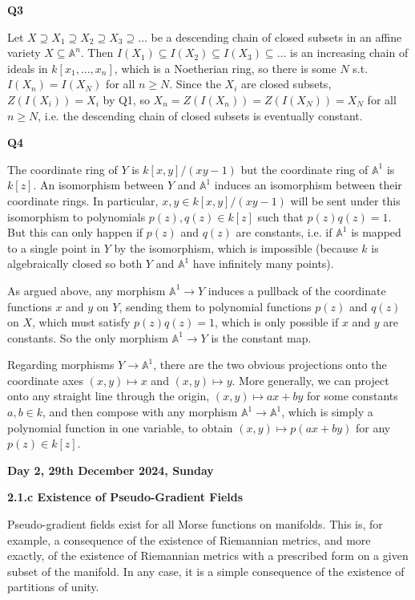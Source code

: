\documentclass[hidelinks, 12pt]{article}
\theoremstyle{mydefstyle}
\theoremstyle{mythmstyle}
\begin{document}
\textbf{Q3}

Let $X \supseteq X_1 \supseteq X_2 \supseteq X_3 \supseteq \dots$ be a descending chain of closed subsets in an affine variety $X \subseteq \mathbb{A}^n$. Then $I(X_1) \subseteq I(X_2) \subseteq I(X_3) \subseteq \dots$ is an increasing chain of ideals in $k[x_1, \dots, x_n]$, which is a Noetherian ring, so there is some $N$ s.t. $I(X_n) = I(X_N)$ for all $n \ge N$. Since the $X_i$ are closed subsets, $Z(I(X_i)) = X_i$ by Q1, so $X_n = Z(I(X_n)) = Z(I(X_N)) = X_N$ for all $n \ge N$, i.e. the descending chain of closed subsets is eventually constant.

\textbf{Q4}

The coordinate ring of $Y$ is $k[x, y]/(xy-1)$ but the coordinate ring of $\mathbb{A}^1$ is $k[z]$. An isomorphism between $Y$ and $\mathbb{A}^1$ induces an isomorphism between their coordinate rings. In particular, $x, y \in k[x, y]/(xy-1)$ will be sent under this isomorphism to polynomials $p(z), q(z) \in k[z]$ such that $p(z)q(z) = 1$. But this can only happen if $p(z)$ and $q(z)$ are constants, i.e. if $\mathbb{A}^1$ is mapped to a single point in $Y$ by the isomorphism, which is impossible (because $k$ is algebraically closed so both $Y$ and $\mathbb{A}^1$ have infinitely many points).

As argued above, any morphism $\mathbb{A}^1 \to Y$ induces a pullback of the coordinate functions $x$ and $y$ on $Y$, sending them to polynomial functions $p(z)$ and $q(z)$ on $X$, which must satisfy $p(z)q(z) = 1$, which is only possible if $x$ and $y$ are constants. So the only morphism $\mathbb{A}^1 \to Y$ is the constant map.

Regarding morphisms $Y \to \mathbb{A}^1$, there are the two obvious projections onto the coordinate axes $(x, y) \mapsto x$ and $(x, y) \mapsto y$. More generally, we can project onto any straight line through the origin, $(x, y) \mapsto ax + by$ for some constants $a, b \in k$, and then compose with any morphism $\mathbb{A}^1 \to \mathbb{A}^1$, which is simply a polynomial function in one variable, to obtain $(x, y) \mapsto p(ax + by)$ for any $p(z) \in k[z]$. 

\newpage

\textbf{Day 2, 29th December 2024, Sunday}

\textbf{2.1.c Existence of Pseudo-Gradient Fields}

Pseudo-gradient fields exist for all Morse functions on manifolds. This is, for example, a consequence of the existence of Riemannian metrics, and more exactly, of the existence of Riemannian metrics with a prescribed form on a given subset of the manifold. In any case, it is a simple consequence of the existence of partitions of unity. 
\end{document}
